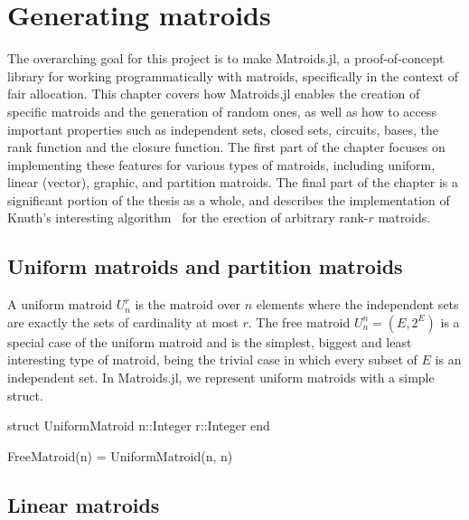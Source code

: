 \chapter{Generating matroids}
The overarching goal for this project is to make Matroids.jl, a proof-of-concept library for working programmatically with matroids, specifically in the context of fair allocation. This chapter covers how Matroids.jl enables the creation of specific matroids and the generation of random ones, as well as how to access important properties such as independent sets, closed sets, circuits, bases, the rank function and the closure function. The first part of the chapter focuses on implementing these features for various types of matroids, including uniform, linear (vector), graphic, and partition matroids. The final part of the chapter is a significant portion of the thesis as a whole, and describes the implementation of Knuth's interesting algorithm~\cite{knuth-1975} for the erection of arbitrary rank-$r$ matroids.


\section{Uniform matroids and partition matroids}
A uniform matroid $U_n^r$ is the matroid over $n$ elements where the independent sets are exactly the sets of cardinality at most $r$. The free matroid $U_n^n = (E, 2^E)$ is a special case of the uniform matroid and is the simplest, biggest and least interesting type of matroid, being the trivial case in which every subset of $E$ is an independent set. In Matroids.jl, we represent uniform matroids with a simple struct.

\begin{jllisting}
struct UniformMatroid
  n::Integer
  r::Integer
end

FreeMatroid(n) = UniformMatroid(n, n)
\end{jllisting}


\section{Linear matroids}

